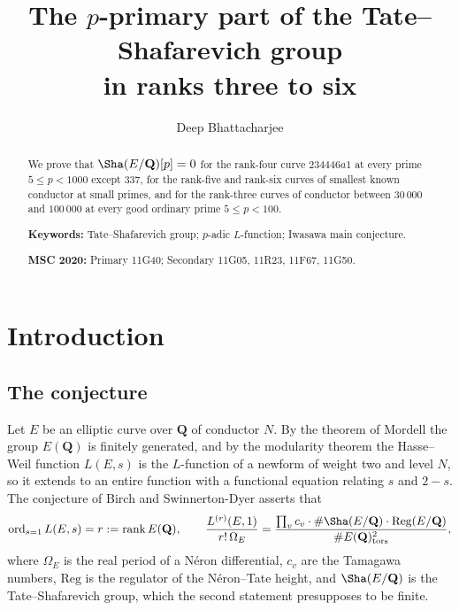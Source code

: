 \documentclass[11pt]{amsart}
\theoremstyle{definition}
\newcommand{\Q}{\mathbf{Q}}
\newcommand{\Reg}{\mathrm{Reg}}
\newcommand{\rk}{\operatorname{rank}}
\newcommand{\ord}{\operatorname{ord}}
\newcommand{\tors}{\mathrm{tors}}
\begin{document}
\title[The $p$-primary part of \texorpdfstring{$\Sha$}{Sha} in ranks three to six]{The $p$-primary part of the Tate--Shafarevich group\\ in ranks three to six}

\author{Deep Bhattacharjee}
\address{Formerly, Electro-Gravitational Space Propulsion Laboratory (EGSPL), Bhubaneswar, Odisha 751030, India}
\address{Formerly, University of Calcutta (Heramba Chandra College), 23/49 Gariahat Road, Golpark, Kolkata 700029, West Bengal, India}


\begin{abstract}
We prove that $\Sha(E/\Q)[p]=0$ for the rank-four curve $234446a1$ at every prime $5\le p<1000$ except $337$, for the rank-five and rank-six curves of smallest known conductor at small primes, and for the rank-three curves of conductor between $30\,000$ and $100\,000$ at every good ordinary prime $5\le p<100$.

\medskip\noindent\textbf{Keywords:} Tate--Shafarevich group; $p$-adic $L$-function; Iwasawa main conjecture.

\smallskip\noindent\textbf{MSC 2020:} Primary 11G40; Secondary 11G05, 11R23, 11F67, 11G50.
\end{abstract}

\maketitle

\section{Introduction}\label{sec:intro}

\subsection{The conjecture}
Let $E$ be an elliptic curve over $\Q$ of conductor $N$. By the theorem of Mordell the group $E(\Q)$ is finitely generated, and by the modularity theorem \cite{Wil95,BCDT01} the Hasse--Weil function $L(E,s)$ is the $L$-function of a newform of weight two and level $N$, so it extends to an entire function with a functional equation relating $s$ and $2-s$. The conjecture of Birch and Swinnerton-Dyer \cite{BSD65} asserts that
\begin{equation}\label{eq:bsd}
\ord_{s=1}L(E,s)=r:=\rk E(\Q),\qquad
\frac{L^{(r)}(E,1)}{r!\,\Omega_E}=\frac{\prod_v c_v\cdot\#\Sha(E/\Q)\cdot\Reg(E/\Q)}{\#E(\Q)_\tors^{2}},
\end{equation}
where $\Omega_E$ is the real period of a N\'eron differential, $c_v$ are the Tamagawa numbers, $\Reg$ is the regulator of the N\'eron--Tate height, and $\Sha(E/\Q)$ is the Tate--Shafarevich group, which the second statement presupposes to be finite.
\end{document}
